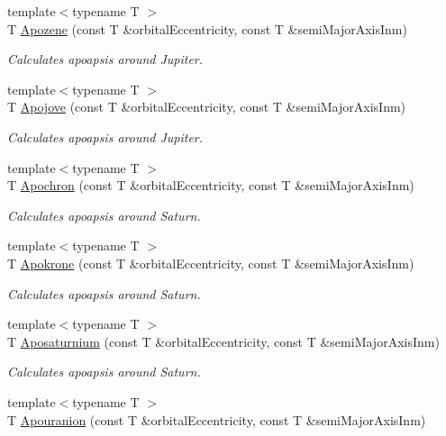 \begin{DoxyCompactItemize}
{\footnotesize template$<$typename T $>$ }\\T \mbox{\hyperlink{group___e_g_x_phys-_apoapsis_ga2de1f63be8e4e22f219c4e947588a207}{Apozene}} (const T \&orbital\+Eccentricity, const T \&semi\+Major\+Axis\+Inm)
\begin{DoxyCompactList}\small\item\em Calculates apoapsis around Jupiter. \end{DoxyCompactList}\item 
{\footnotesize template$<$typename T $>$ }\\T \mbox{\hyperlink{group___e_g_x_phys-_apoapsis_gad2a2021d43526fc752fe87beff789b28}{Apojove}} (const T \&orbital\+Eccentricity, const T \&semi\+Major\+Axis\+Inm)
\begin{DoxyCompactList}\small\item\em Calculates apoapsis around Jupiter. \end{DoxyCompactList}\item 
{\footnotesize template$<$typename T $>$ }\\T \mbox{\hyperlink{group___e_g_x_phys-_apoapsis_gac978de20a08121198f73637018c80eee}{Apochron}} (const T \&orbital\+Eccentricity, const T \&semi\+Major\+Axis\+Inm)
\begin{DoxyCompactList}\small\item\em Calculates apoapsis around Saturn. \end{DoxyCompactList}\item 
{\footnotesize template$<$typename T $>$ }\\T \mbox{\hyperlink{group___e_g_x_phys-_apoapsis_ga572bf783c39ce472a06e89063f1fd1a7}{Apokrone}} (const T \&orbital\+Eccentricity, const T \&semi\+Major\+Axis\+Inm)
\begin{DoxyCompactList}\small\item\em Calculates apoapsis around Saturn. \end{DoxyCompactList}\item 
{\footnotesize template$<$typename T $>$ }\\T \mbox{\hyperlink{group___e_g_x_phys-_apoapsis_gabb69067baa611c8bda701d7040cc47b6}{Aposaturnium}} (const T \&orbital\+Eccentricity, const T \&semi\+Major\+Axis\+Inm)
\begin{DoxyCompactList}\small\item\em Calculates apoapsis around Saturn. \end{DoxyCompactList}\item 
{\footnotesize template$<$typename T $>$ }\\T \mbox{\hyperlink{group___e_g_x_phys-_apoapsis_gae6f96c6d840188839132e0ef94ce0711}{Apouranion}} (const T \&orbital\+Eccentricity, const T \&semi\+Major\+Axis\+Inm)

\end{DoxyCompactItemize}
